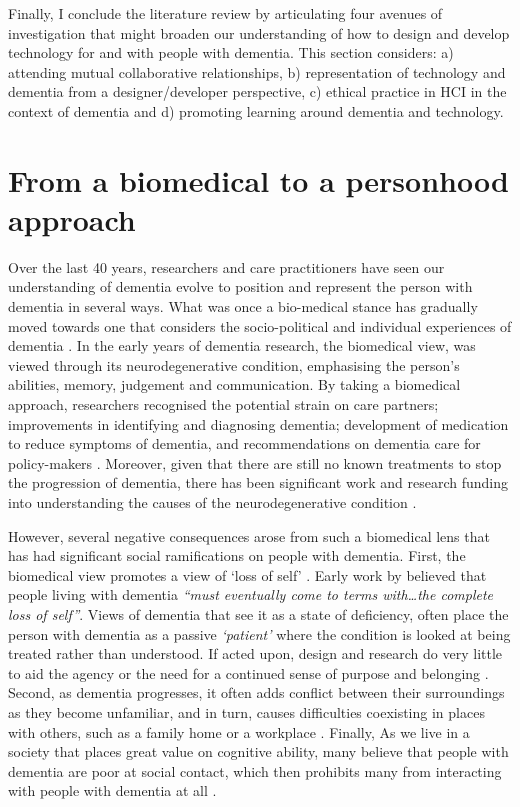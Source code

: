 Finally, I conclude the literature review by articulating four avenues of investigation that might broaden our understanding of how to design and develop technology for and with people with dementia. This section considers: a) attending mutual collaborative relationships, b) representation of technology and dementia from a designer/developer perspective, c) ethical practice in HCI in the context of dementia and d) promoting learning around dementia and technology.

\section{From a biomedical to a personhood approach}
\label{BL:DementiaHCI}
Over the last 40 years, researchers and care practitioners have seen our understanding of dementia evolve to position and represent the person with dementia in several ways. What was once a bio-medical stance has gradually moved towards one that considers the socio-political and individual experiences of dementia \citep{bellass_broadening_2019}. In the early years of dementia research, the biomedical view, was viewed through its neurodegenerative condition, emphasising the person's abilities, memory, judgement and communication. By taking a biomedical approach, researchers recognised the potential strain on care partners; improvements in identifying and diagnosing dementia; development of medication to reduce symptoms of dementia, and recommendations on dementia care for policy-makers \citep{doi:10.1080/13607863.2019.1693968}. Moreover, given that there are still no known treatments to stop the progression of dementia, there has been significant work and research funding into understanding the causes of the neurodegenerative condition \citep{bature_signs_2017}.

However, several negative consequences arose from such a biomedical lens that has had significant social ramifications on people with dementia. First, the biomedical view promotes a view of `loss of self' \citep{ryan_dementia_2009}. Early work by \cite{cohen_loss_1986} believed that people living with dementia \textit{``must eventually come to terms with…the complete loss of self''}. Views of dementia that see it as a state of deficiency, often place the person with dementia as a passive \textit{`patient'} where the condition is looked at being treated rather than understood. If acted upon, design and research do very little to aid the agency or the need for a continued sense of purpose and belonging \citep{hampson_dementia:_2016}. Second, as dementia progresses, it often adds conflict between their surroundings as they become unfamiliar, and in turn, causes difficulties coexisting in places with others, such as a family home or a workplace \citep{langdon_making_2007}. Finally, As we live in a society that places great value on cognitive ability, many believe that people with dementia are poor at social contact, which then prohibits many from interacting with people with dementia at all \citep{killick_communication_2001}.


